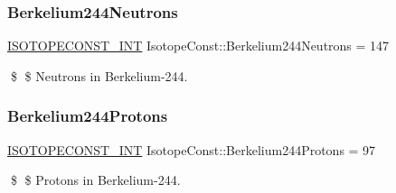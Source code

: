\subsubsection{\texorpdfstring{Berkelium244\+Neutrons}{Berkelium244Neutrons}}
{\footnotesize\ttfamily \mbox{\hyperlink{group___isotope_const-_macros_ga5f18360b3e99483a35c32d789e62621c}{I\+S\+O\+T\+O\+P\+E\+C\+O\+N\+S\+T\+\_\+\+I\+NT}} Isotope\+Const\+::\+Berkelium244\+Neutrons = 147}

\$ \$ Neutrons in Berkelium-\/244. \mbox{\label{group___isotope_const-_berkelium-_bk244_ga3444b3daf739c754f02416a9bcb1da86}} 
\subsubsection{\texorpdfstring{Berkelium244\+Protons}{Berkelium244Protons}}
{\footnotesize\ttfamily \mbox{\hyperlink{group___isotope_const-_macros_ga5f18360b3e99483a35c32d789e62621c}{I\+S\+O\+T\+O\+P\+E\+C\+O\+N\+S\+T\+\_\+\+I\+NT}} Isotope\+Const\+::\+Berkelium244\+Protons = 97}

\$ \$ Protons in Berkelium-\/244. 